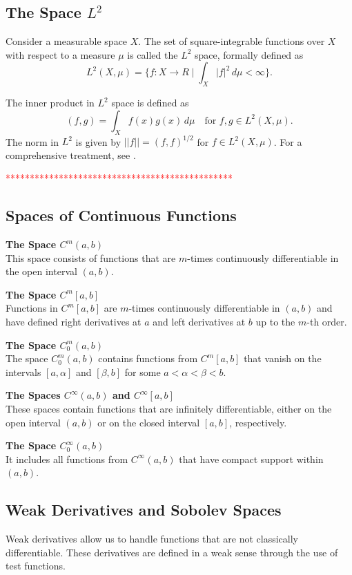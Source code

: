 \documentclass[../../main.tex]{subfiles}
\begin{document}
\subsection*{The Space \( L^2 \)}
Consider a measurable space \( X \). The set of square-integrable functions over \( X \) with respect to a measure \( \mu \) is called the \( L^2 \) space, formally defined as
\[ L^2(X, \mu) = \{ f: X \to R \mid \int_X |f|^2 \, d\mu < \infty \}. \]

The inner product in \( L^2 \) space is defined as
\[ (f,g) = \int_X f(x)g(x) \, d\mu \quad \text{for } f, g \in L^2(X, \mu). \]
The norm in \( L^2 \) is given by \( ||f|| = (f,f)^{1/2} \) for \( f \in L^2(X, \mu) \). For a comprehensive treatment, see \cite{Rud53}.

\textcolor{red}{***********************************************}

\subsection*{Spaces of Continuous Functions}

\textbf{The Space \( C^m(a,b) \)}\\
This space consists of functions that are \( m \)-times continuously differentiable in the open interval \( (a, b) \).

\textbf{The Space \( C^m[a,b] \)}\\
Functions in \( C^m[a,b] \) are \( m \)-times continuously differentiable in \( (a, b) \) and have defined right derivatives at \( a \) and left derivatives at \( b \) up to the \( m \)-th order.

\textbf{The Space \( C_0^m(a,b) \)}\\
The space \( C_0^m(a,b) \) contains functions from \( C^m[a,b] \) that vanish on the intervals \( [a, \alpha] \) and \( [\beta, b] \) for some \( a < \alpha < \beta < b \).

\textbf{The Spaces \( C^\infty(a,b) \) and \( C^\infty[a,b] \)}\\
These spaces contain functions that are infinitely differentiable, either on the open interval \( (a, b) \) or on the closed interval \( [a, b] \), respectively.

\textbf{The Space \( C_0^\infty(a,b) \)}\\
It includes all functions from \( C^\infty(a,b) \) that have compact support within \( (a, b) \).

\subsection*{Weak Derivatives and Sobolev Spaces}
Weak derivatives allow us to handle functions that are not classically differentiable. These derivatives are defined in a weak sense through the use of test functions.
\end{document}
